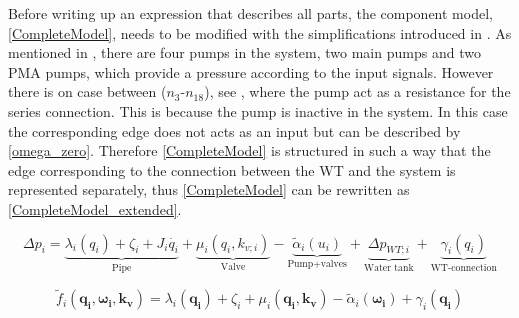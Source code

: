 Before writing up an expression that describes all parts, the component model, \eqref{CompleteModel}, needs to be modified with the simplifications introduced in . As mentioned in , there are four pumps in the system, two main pumps and two PMA pumps, which provide a pressure according to the input signals. However there is on case between ($n_3$-$n_{18}$), see , where the pump act as a resistance for the series connection. This is because the pump is inactive in the system. In this case the corresponding edge does not acts as an input but can be described by \eqref{omega_zero}. Therefore \eqref{CompleteModel} is structured in such a way that the edge corresponding to the connection between the WT and the system is represented separately, thus \eqref{CompleteModel} can be rewritten as  \eqref{CompleteModel_extended}.


\begin{equation}
\label{CompleteModel_extended}
\Delta p_i = \underbrace{\lambda_i (q_i) + \zeta_i + J_i \dot{q_i}}_\text{Pipe} + \underbrace{\mu_i (q_i, k_{v;i})}_\text{Valve} - \underbrace{\tilde{\alpha}_i(u_i)}_\text{Pump+valves} + \underbrace{\Delta p_{WT;i}}_\text{Water tank} + \underbrace{\gamma_i (q_i)}_\text{WT-connection}
\end{equation}


\begin{equation}
  \tilde{f}_i(\bm{q_{i}}, \bm{\omega_i}, \bm{k_v}) = \lambda_i(\bm{q_{i}}) + \zeta_i + \mu_i(\bm{q_{i}}, \bm{k_v}) - \tilde{\alpha}_i(\bm{\omega_i}) + \gamma_i (\bm{q_i})
  \label{ComponentFunction}
\end{equation}

